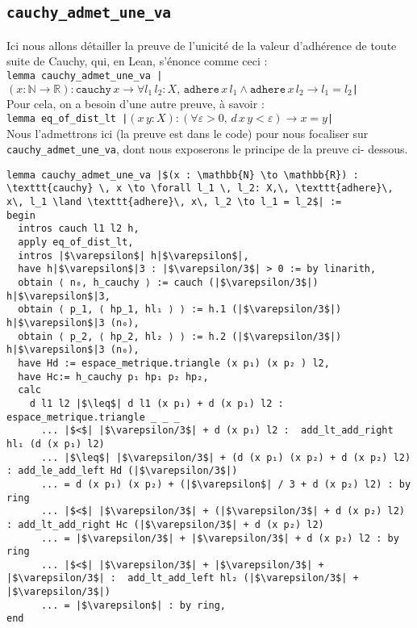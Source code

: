 \subsection{\texttt{cauchy\_admet\_une\_va}}
Ici nous allons détailler la preuve de l'unicité de la valeur d'adhérence de toute suite de Cauchy, qui, en Lean, s'énonce comme ceci : \\
\texttt{lemma cauchy_admet_une_va |$(x : \mathbb{N} \to \mathbb{R}) : \texttt{cauchy} \, x \to \forall l_1 \, l_2: X,\, \texttt{adhere}\, x\, l_1 \land \texttt{adhere}\, x\, l_2 \to l_1 = l_2$|}\\
Pour cela, on a besoin d'une autre preuve, à savoir : \\
\texttt{lemma eq_of_dist_lt |$(x\, y : X) : (\forall \varepsilon > 0,\, d\, x\, y < \varepsilon) \to x = y$| }\\
Nous l'admettrons ici (la preuve est dans le code) pour nous focaliser sur \texttt{cauchy\_admet\_une\_va}, dont nous exposerons le principe de la preuve ci- dessous. 
\begin{verbatim}
lemma cauchy_admet_une_va |$(x : \mathbb{N} \to \mathbb{R}) : \texttt{cauchy} \, x \to \forall l_1 \, l_2: X,\, \texttt{adhere}\, x\, l_1 \land \texttt{adhere}\, x\, l_2 \to l_1 = l_2$| :=
begin
  intros cauch l1 l2 h,
  apply eq_of_dist_lt,
  intros |$\varepsilon$| h|$\varepsilon$|,
  have h|$\varepsilon$|3 : |$\varepsilon/3$| > 0 := by linarith,
  obtain ⟨ n₀, h_cauchy ⟩ := cauch (|$\varepsilon/3$|) h|$\varepsilon$|3,
  obtain ⟨ p_1, ⟨ hp_1, hl₁ ⟩ ⟩ := h.1 (|$\varepsilon/3$|) h|$\varepsilon$|3 (n₀),
  obtain ⟨ p_2, ⟨ hp_2, hl₂ ⟩ ⟩ := h.2 (|$\varepsilon/3$|) h|$\varepsilon$|3 (n₀),
  have Hd := espace_metrique.triangle (x p₁) (x p₂ ) l2,
  have Hc:= h_cauchy p₁ hp₁ p₂ hp₂,
  calc
    d l1 l2 |$\leq$| d l1 (x p₁) + d (x p₁) l2 : espace_metrique.triangle _ _ _
      ... |$<$| |$\varepsilon/3$| + d (x p₁) l2 :  add_lt_add_right hl₁ (d (x p₁) l2)
      ... |$\leq$| |$\varepsilon/3$| + (d (x p₁) (x p₂) + d (x p₂) l2) : add_le_add_left Hd (|$\varepsilon/3$|)
      ... = d (x p₁) (x p₂) + (|$\varepsilon$| / 3 + d (x p₂) l2) : by ring 
      ... |$<$| |$\varepsilon/3$| + (|$\varepsilon/3$| + d (x p₂) l2) : add_lt_add_right Hc (|$\varepsilon/3$| + d (x p₂) l2)
      ... = |$\varepsilon/3$| + |$\varepsilon/3$| + d (x p₂) l2 : by ring
      ... |$<$| |$\varepsilon/3$| + |$\varepsilon/3$| + |$\varepsilon/3$| :  add_lt_add_left hl₂ (|$\varepsilon/3$| + |$\varepsilon/3$|)
      ... = |$\varepsilon$| : by ring,
end
\end{verbatim}

